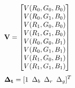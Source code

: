 \begin{equation}
    \mathbf{V} = \begin{bmatrix}
    V(R_0, G_0, B_0) \\
    V(R_0, G_1, B_0) \\
    V(R_1, G_0, B_0) \\
    V(R_1, G_1, B_0) \\
    V(R_0, G_0, B_1) \\
    V(R_0, G_1, B_1) \\
    V(R_1, G_0, B_1) \\
    V(R_1, G_1, B_1)
    \end{bmatrix}\\ \\
\end{equation}
\begin{equation}
    \mathbf{\Delta_t} = [1 \enspace \Delta_b \enspace \Delta_r \enspace \Delta_g]^T
\end{equation}

